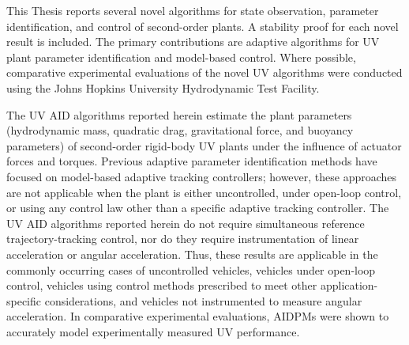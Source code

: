 This Thesis reports several novel algorithms for state observation,
parameter identification, and control of second-order plants.
%
A stability proof for each novel result is included.
%
The primary contributions are adaptive algorithms for \ac{UV}
plant parameter identification and model-based control.
%
Where possible, comparative experimental evaluations of the novel
\ac{UV} algorithms were conducted using the Johns Hopkins University
Hydrodynamic Test Facility.


The \ac{UV} \ac{AID} algorithms reported herein estimate the plant
parameters (hydrodynamic mass, quadratic drag, gravitational force,
and buoyancy parameters) of second-order rigid-body \ac{UV} plants
under the influence of actuator forces and torques.
%
Previous adaptive parameter identification methods have focused on
model-based adaptive tracking controllers; however, these approaches
are not applicable when the plant is either uncontrolled, under
open-loop control, or using any control law other than a specific
adaptive tracking controller.
%
The \ac{UV} \ac{AID} algorithms reported herein do not require
simultaneous reference trajectory-tracking control, nor do they require
instrumentation of linear acceleration or angular acceleration.
%
Thus, these results are applicable in the commonly occurring cases of
uncontrolled vehicles, vehicles under open-loop control, vehicles
using control methods prescribed to meet other application-specific
considerations, and vehicles not instrumented to measure angular
acceleration.
% 
In comparative experimental evaluations, \acp{AIDPM} were shown to
accurately model experimentally measured \ac{UV} performance.


